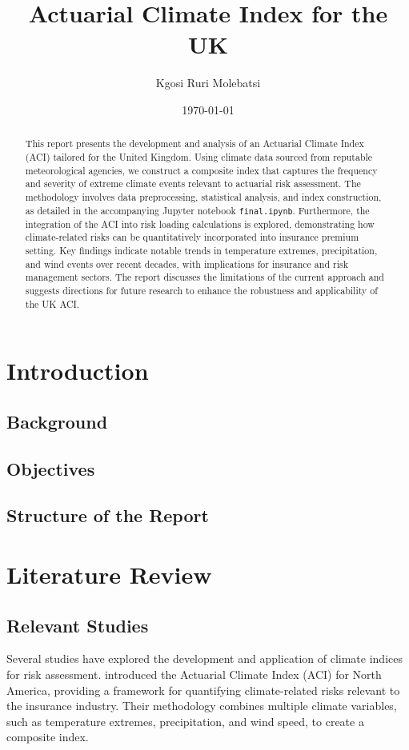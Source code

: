 \documentclass[12pt,a4paper]{report}
\title{Actuarial Climate Index for the UK}
\author{Kgosi Ruri Molebatsi}
\date{\today}
\begin{document}
\maketitle

\begin{abstract}
This report presents the development and analysis of an Actuarial Climate Index (ACI) tailored for the United Kingdom. 
Using climate data sourced from reputable meteorological agencies, we construct a composite index that captures the frequency and severity of extreme climate events relevant to actuarial risk assessment. 
The methodology involves data preprocessing, statistical analysis, and index construction, as detailed in the accompanying Jupyter notebook \texttt{final.ipynb}. 
Furthermore, the integration of the ACI into risk loading calculations is explored, demonstrating how climate-related risks can be quantitatively incorporated into insurance premium setting. 
Key findings indicate notable trends in temperature extremes, precipitation, and wind events over recent decades, with implications for insurance and risk management sectors. 
The report discusses the limitations of the current approach and suggests directions for future research to enhance the robustness and applicability of the UK ACI.
\end{abstract}

\tableofcontents
\listoffigures
\listoftables

\chapter{Introduction}
\section{Background}
\section{Objectives}
\section{Structure of the Report}

\chapter{Literature Review}
\section{Relevant Studies}
Several studies have explored the development and application of climate indices for risk assessment. \citet{brooks2014actuarial} introduced the Actuarial Climate Index (ACI) for North America, providing a framework for quantifying climate-related risks relevant to the insurance industry. Their methodology combines multiple climate variables, such as temperature extremes, precipitation, and wind speed, to create a composite index.
\end{document}
